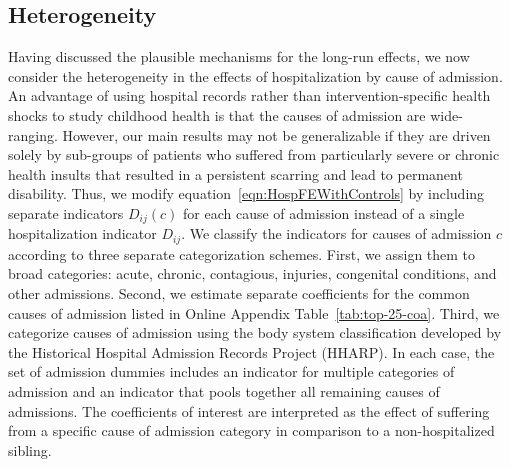 \documentclass[12pt,english]{article}
\begin{document}
\subsection[Heterogeneity]{Heterogeneity}\label{sec:Heterogeneity}

Having discussed the plausible mechanisms for the long-run effects, we now consider the heterogeneity in the effects of hospitalization by cause of admission. An advantage of using hospital records rather than intervention-specific health shocks to study childhood health is that the causes of admission are wide-ranging. However, our main results may not be generalizable if they are driven solely by sub-groups of patients who suffered from particularly severe or chronic health insults that resulted in a persistent scarring and lead to permanent disability. Thus, we modify equation~\ref{eqn:HospFEWithControls} by including separate indicators $D_{ij}(c)$ for each cause of admission instead of a single hospitalization indicator $D_{ij}$. We classify the indicators for causes of admission $c$ according to three separate categorization schemes. First, we assign them to broad categories: acute, chronic, contagious, injuries, congenital conditions, and other admissions. Second, we estimate separate coefficients for the common causes of admission listed in Online Appendix Table~\ref{tab:top-25-coa}. Third, we categorize causes of admission using the body system classification developed by the Historical Hospital Admission Records Project (HHARP). In each case, the set of admission dummies includes an indicator for multiple categories of admission and an indicator that pools together all remaining causes of admissions. The coefficients of interest are interpreted as the effect of suffering from a specific cause of admission category in comparison to a non-hospitalized sibling.
\end{document}
